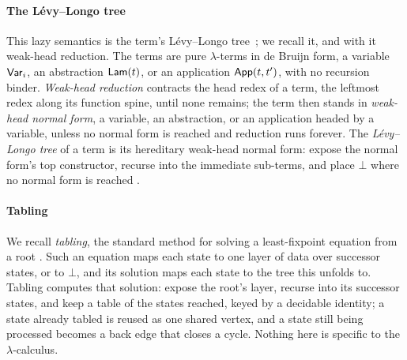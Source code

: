 \paragraph{The L\'evy--Longo tree}
This lazy semantics is the term's L\'evy--Longo tree~\cite{longo1983-set-theoretical-models, levy-longo}; we recall it, and with it weak-head reduction. The terms are pure $\lambda$-terms in de Bruijn form, a variable $\mathsf{Var}_i$, an abstraction $\mathsf{Lam}(t)$, or an application $\mathsf{App}(t, t')$, with no recursion binder. \emph{Weak-head reduction} contracts the head redex of a term, the leftmost redex along its function spine, until none remains; the term then stands in \emph{weak-head normal form}, a variable, an abstraction, or an application headed by a variable, unless no normal form is reached and reduction runs forever. The \emph{L\'evy--Longo tree} of a term is its hereditary weak-head normal form: expose the normal form's top constructor, recurse into the immediate sub-terms, and place $\bot$ where no normal form is reached \cite{barendregt, wadsworth-graph, abramsky-ong}.

\paragraph{Tabling}
We recall \emph{tabling}, the standard method for solving a least-fixpoint equation from a root \cite{tamaki-sato, tabling-slg, vanemden-kowalski}. Such an equation maps each state to one layer of data over successor states, or to $\bot$, and its solution maps each state to the tree this unfolds to. Tabling computes that solution: expose the root's layer, recurse into its successor states, and keep a table of the states reached, keyed by a decidable identity; a state already tabled is reused as one shared vertex, and a state still being processed becomes a back edge that closes a cycle. Nothing here is specific to the $\lambda$-calculus.

